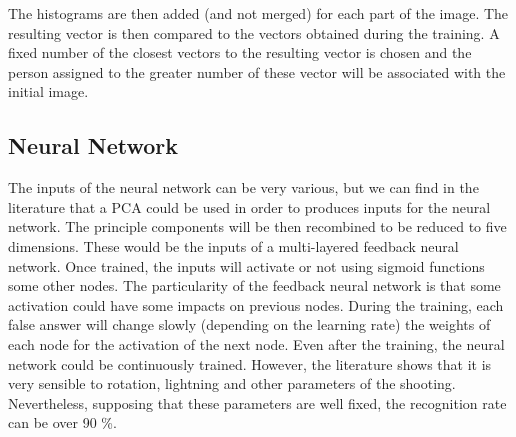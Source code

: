The histograms are then added (and not merged) for each part of the image. The resulting vector is then compared to the vectors obtained during the training. A fixed number of the closest vectors to the resulting vector is chosen and the person assigned to the greater number of these vector will be associated with the initial image.

\subsection{Neural Network}
The inputs of the neural network can be very various, but we can find in the literature that a PCA could be used in order to produces inputs for the neural network. The principle components will be then recombined to be reduced to five dimensions. These would be the inputs of a multi-layered feedback neural network. Once trained, the inputs will activate or not using sigmoid functions some other nodes. The particularity of the feedback neural network is that some activation could have some impacts on previous nodes.
During the training, each false answer  will change slowly (depending on the learning rate) the weights of each node for the activation of the next node. Even after the training, the neural network could be continuously trained. However, the literature shows that it is very sensible to rotation, lightning and other parameters of the shooting. Nevertheless, supposing that these parameters are well fixed, the recognition rate can be over 90 \%.
